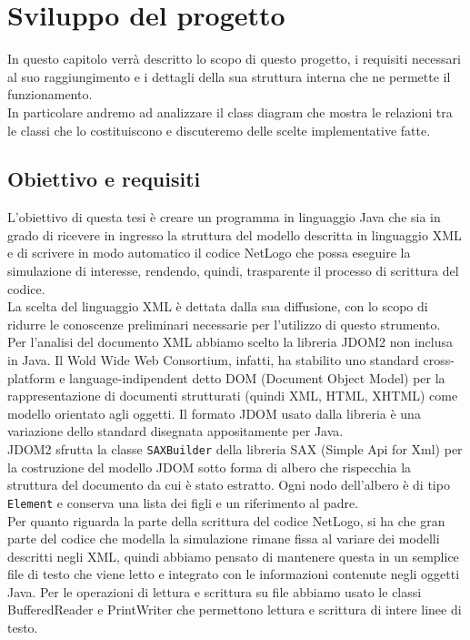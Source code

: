 \chapter{Sviluppo del progetto}
\label{cap:sviluppo-progetto}
In questo capitolo verrà descritto lo scopo di questo progetto, i requisiti necessari al suo raggiungimento e i dettagli della sua struttura interna che ne permette il funzionamento. \\
In particolare andremo ad analizzare il class diagram che mostra le relazioni tra le classi che lo costituiscono e discuteremo delle scelte implementative fatte.

\section{Obiettivo e requisiti}
L'obiettivo di questa tesi è creare un programma in linguaggio Java che sia in grado di ricevere in ingresso la struttura del modello descritta in linguaggio XML e di scrivere in modo automatico il codice NetLogo che possa eseguire la simulazione di interesse, rendendo, quindi, trasparente il processo di scrittura del codice.\\
La scelta del linguaggio XML è dettata dalla sua diffusione, con lo scopo di ridurre le conoscenze preliminari necessarie per l'utilizzo di questo strumento.\\
Per l'analisi del documento XML abbiamo scelto la libreria JDOM2 \cite{jdom} non inclusa in Java. Il Wold Wide Web Consortium, infatti, ha stabilito uno standard cross-platform e language-indipendent detto DOM (Document Object Model) per la rappresentazione di documenti strutturati (quindi XML, HTML, XHTML) come modello orientato agli oggetti. Il formato JDOM \cite{jdom} usato dalla libreria è una variazione dello standard disegnata appositamente per Java.\\
JDOM2 sfrutta la classe \texttt{SAXBuilder} della libreria SAX (Simple Api for Xml) per la costruzione del modello JDOM sotto forma di albero che rispecchia la struttura del documento da cui è stato estratto. Ogni nodo dell'albero è di tipo \texttt{Element} e conserva una lista dei figli e un riferimento al padre.\\
Per quanto riguarda la parte della scrittura del codice NetLogo, si ha che gran parte del codice che modella la simulazione rimane fissa al variare dei modelli descritti negli XML, quindi abbiamo pensato di mantenere questa in un semplice file di testo che viene letto e integrato con le informazioni contenute negli oggetti Java. Per le operazioni di lettura e scrittura su file abbiamo usato le classi BufferedReader \cite{buffered-reader} e PrintWriter \cite{print-writer} che permettono lettura e scrittura di intere linee di testo.\\ 
